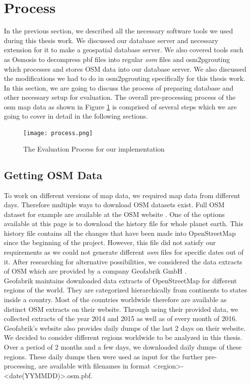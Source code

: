 \section{Process} \label{process}
In the previous section, we described all the necessary software tools we used during this thesis work. We discussed our database server and necessary extension for it to make a geospatial database server. We also covered tools such as Osmosis to decompress pbf files into regular \textit{osm} files and osm2pgrouting which processes and stores OSM data into our database server. We also discussed the modifications we had to do in osm2pgrouting specifically for this thesis work. In this section, we are going to discuss the process of preparing database and other necessary setup for evaluation. The overall pre-processing process of the osm map data as shown in Figure \ref{fg:process} is comprised of several steps which we are going to cover in detail in the following sections. 

\begin{figure}
\centering
\texttt{[image: process.png]}
\caption{The Evaluation Process for our implementation}
\label{fg:process}
\end{figure}

\subsection{Getting OSM Data}\label{data}
To work on different versions of map data, we required map data from different days. Therefore multiple ways to download OSM datasets exist. Full OSM dataset for example are available at the OSM website \cite{planetosm}. One of the options available at this page is to download the history file for whole planet earth. This history file contains all the changes that have been made into OpenStreetMap since the beginning of the project. However, this file did not satisfy our requirements as we could not generate different \textit{osm} files for specific dates out of it. After researching for alternative possibilities, we considered the data extracts of OSM which are provided by a company Geofabrik GmbH \cite{geofabrik}. \\

Geofabrik \cite{geofabrik} maintains downloaded data extracts of OpenStreetMap for different regions of the world. They are categorized hierarchically from continents to states inside a country. Most of the countries worldwide therefore are available as distinct OSM extracts on their website. Through using their provided data, we collected extracts of the year 2014 and 2015 as well as of every month of 2016. Geofabrik's website also provides daily dumps of the last 2 days on their website. We decided to consider different regions worldwide to be analyzed in this thesis. Over a period of 2 months and a few days, we downloaded daily dumps of these regions. These daily dumps then were used as input for the further pre-processing, are available with filenames in format <region>-<date(YYMMDD)>.osm.pbf.

